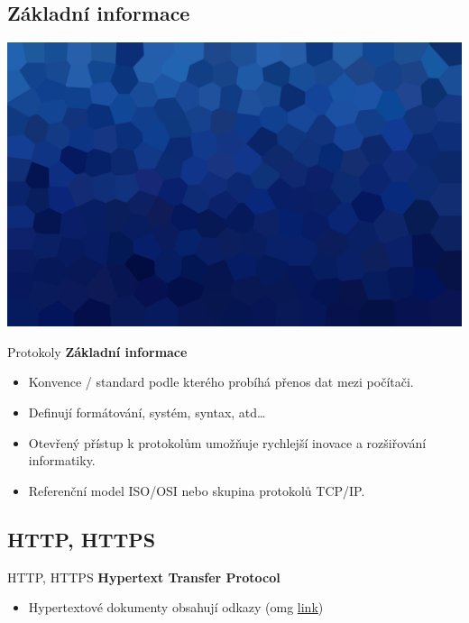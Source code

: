 \documentclass[aspectratio=169,xcolor=dvipsnames, t]{beamer}
\begin{document}
\subsection{Základní informace}
{
    \includegraphics[width=\paperwidth,height=\paperheight]{AICStyleData/logos/mene_polygonu_bg.png}
}
\begin{frame}{Protokoly}
    \vspace{-0.5cm}
    \textbf{\large Základní informace}

    \begin{itemize}
        \item Konvence / standard podle kterého probíhá přenos dat mezi počítači.
        \item Definují formátování, systém, syntax, atd\ldots
        \item Otevřený přístup k protokolům umožňuje rychlejší inovace a rozšiřování informatiky.
        \item Referenční model ISO/OSI nebo skupina protokolů TCP/IP.
    \end{itemize}
\end{frame}

\subsection{HTTP, HTTPS}
\begin{frame}{HTTP, HTTPS}
    \vspace{-0.5cm}
    \textbf{\large Hypertext Transfer Protocol}
    \begin{itemize}
        \item Hypertextové dokumenty obsahují odkazy (omg \href{https://www.youtube.com/watch?v=ZbWIs6z3Thw}{link})
    \end{itemize}
\end{frame}
\end{document}

